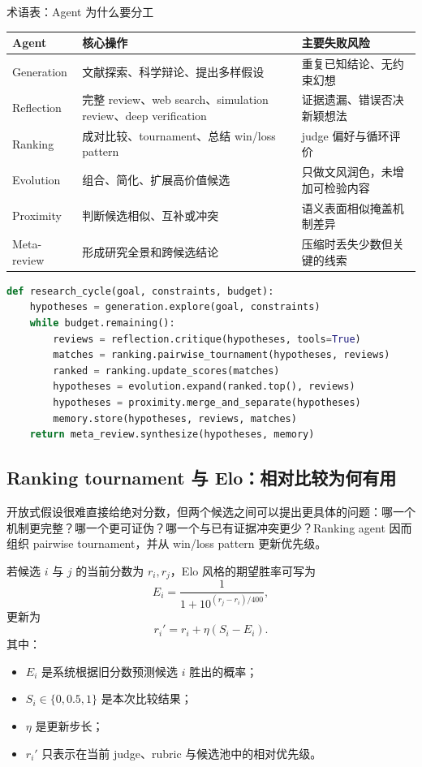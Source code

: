\begin{knowledgebox}{术语表：Agent 为什么要分工}
\begin{tabular}{L{0.17\textwidth}L{0.33\textwidth}L{0.32\textwidth}}
\toprule
Agent & 核心操作 & 主要失败风险 \\
\midrule
Generation & 文献探索、科学辩论、提出多样假设 & 重复已知结论、无约束幻想 \\
Reflection & 完整 review、web search、simulation review、deep verification & 证据遗漏、错误否决新颖想法 \\
Ranking & 成对比较、tournament、总结 win/loss pattern & judge 偏好与循环评价 \\
Evolution & 组合、简化、扩展高价值候选 & 只做文风润色，未增加可检验内容 \\
Proximity & 判断候选相似、互补或冲突 & 语义表面相似掩盖机制差异 \\
Meta-review & 形成研究全景和跨候选结论 & 压缩时丢失少数但关键的线索 \\
\bottomrule
\end{tabular}
\end{knowledgebox}

\begin{lstlisting}[language=Python,caption={Generate--debate--evolve 的概念性循环}]
def research_cycle(goal, constraints, budget):
    hypotheses = generation.explore(goal, constraints)
    while budget.remaining():
        reviews = reflection.critique(hypotheses, tools=True)
        matches = ranking.pairwise_tournament(hypotheses, reviews)
        ranked = ranking.update_scores(matches)
        hypotheses = evolution.expand(ranked.top(), reviews)
        hypotheses = proximity.merge_and_separate(hypotheses)
        memory.store(hypotheses, reviews, matches)
    return meta_review.synthesize(hypotheses, memory)
\end{lstlisting}

\subsection{Ranking tournament 与 Elo：相对比较为何有用}

开放式假设很难直接给绝对分数，但两个候选之间可以提出更具体的问题：哪一个机制更完整？哪一个更可证伪？哪一个与已有证据冲突更少？Ranking agent 因而组织 pairwise tournament，并从 win/loss pattern 更新优先级。

若候选 $i$ 与 $j$ 的当前分数为 $r_i,r_j$，Elo 风格的期望胜率可写为
$$
E_i=\frac{1}{1+10^{(r_j-r_i)/400}},
$$
更新为
$$
r_i' = r_i + \eta(S_i-E_i).
$$
其中：
\begin{itemize}
  \item $E_i$ 是系统根据旧分数预测候选 $i$ 胜出的概率；
  \item $S_i\in\{0,0.5,1\}$ 是本次比较结果；
  \item $\eta$ 是更新步长；
  \item $r_i'$ 只表示在当前 judge、rubric 与候选池中的相对优先级。
\end{itemize}

